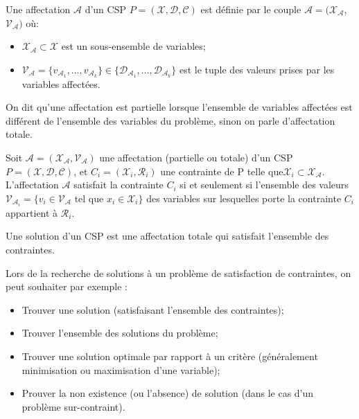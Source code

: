 \begin{definition} Une affectation $\mathcal{A}$ d'un CSP $P = (\mathcal{X},\mathcal{D},\mathcal{C})$ est définie par le couple $\mathcal{A} = (\mathcal{X_{\mathcal{A}}}$, $\mathcal{V_{\mathcal{A}}})$ où:
	\label{def:affectation-CSP}
	\begin{itemize}
		\item $\mathcal{X_{\mathcal{A}}} \subset \mathcal{X}$ est un sous-ensemble de variables;
		\item $\mathcal{V_{\mathcal{A}}} = \{ v_{\mathcal{A}_1}, \dots, v_{\mathcal{A}_k}\} \in \{ \mathcal{D}_{\mathcal{A}_1}, \dots, \mathcal{D}_{\mathcal{A}_k}\}$ est le tuple des valeurs prises par les variables affectées.
	\end{itemize}	
\end{definition}

On dit qu'une affectation est partielle lorsque l'ensemble de variables affectées est différent de l'ensemble des variables du problème, sinon on parle d'affectation totale.

\begin{definition} Soit $\mathcal{A} = (\mathcal{X_{\mathcal{A}}}, \mathcal{V_{\mathcal{A}}})$ une affectation (partielle ou totale) d'un CSP $P = (\mathcal{X},\mathcal{D},\mathcal{C})$, et $C_i = (\mathcal{X}_i, \mathcal{R}_i)$ une contrainte de P telle que$ \mathcal{X}_i \subset \mathcal{X_{\mathcal{A}}}$. 
	L'affectation $\mathcal{A}$ satisfait la contrainte $C_i$ si et seulement si l'ensemble des valeurs $\mathcal{V}_{\mathcal{A}_i} = \{ v_i \in \mathcal{V}_{\mathcal{A}} \mbox{ tel que } x_i \in \mathcal{X}_{i} \}$ des variables sur lesquelles porte la contrainte $C_i$ appartient à $\mathcal{R}_i$.
	\label{def:affecPar-csp}
\end{definition}

\begin{definition} Une solution d'un CSP est une affectation totale qui satisfait l'ensemble des contraintes.
	\label{def:sol-csp}
\end{definition}

Lors de la recherche de solutions à un problème de satisfaction de contraintes, on peut souhaiter par exemple :
\begin{itemize}
	\item Trouver une solution (satisfaisant l'ensemble des contraintes);
	\item Trouver l'ensemble des solutions du problème;
	\item Trouver une solution optimale par rapport à un critère (généralement minimisation ou maximisation d'une variable);
\item Prouver la non existence (ou l'absence) de solution (dans le cas d'un problème sur-contraint).
\end{itemize}

